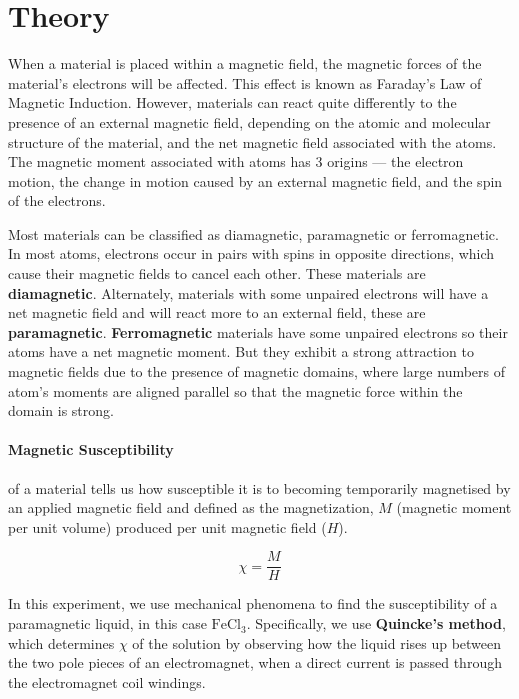\section{Theory}

When a material is placed within a magnetic field, the magnetic forces of the material's electrons will be affected. This effect is known as Faraday's Law of Magnetic Induction. However, materials can react quite differently to the presence of an external magnetic field, depending on the atomic and molecular structure of the material, and the net magnetic field associated with the atoms. The magnetic moment associated with atoms has 3 origins --- the electron motion, the change in motion caused by an external magnetic field, and the spin of the electrons.

Most materials can be classified as diamagnetic, paramagnetic or ferromagnetic. In most atoms, electrons occur in pairs with spins in opposite directions, which cause their magnetic fields to cancel each other. These materials are \textbf{diamagnetic}. Alternately, materials with some unpaired electrons will have a net magnetic field and will react more to an external field, these are \textbf{paramagnetic}. \textbf{Ferromagnetic} materials have some unpaired electrons so their atoms have a net magnetic moment. But they exhibit a strong attraction to magnetic fields due to the presence of magnetic domains, where large numbers of atom's moments are aligned parallel so that the magnetic force within the domain is strong.

\paragraph{\textbf{Magnetic Susceptibility}} of a material tells us how susceptible it is to becoming temporarily magnetised by an applied magnetic field and defined as the magnetization, $M$ (magnetic moment per unit volume) produced per unit magnetic field ($H$).

\begin{equation}
    \chi = \frac{M}{H}
\end{equation}

In this experiment, we use mechanical phenomena to find the susceptibility of a paramagnetic liquid, in this case $\text{FeCl}_3$. Specifically, we use \textbf{Quincke's method}, which determines $\chi$ of the solution by observing how the liquid rises up between the two pole pieces of an electromagnet, when a direct current is passed through the electromagnet coil windings.

